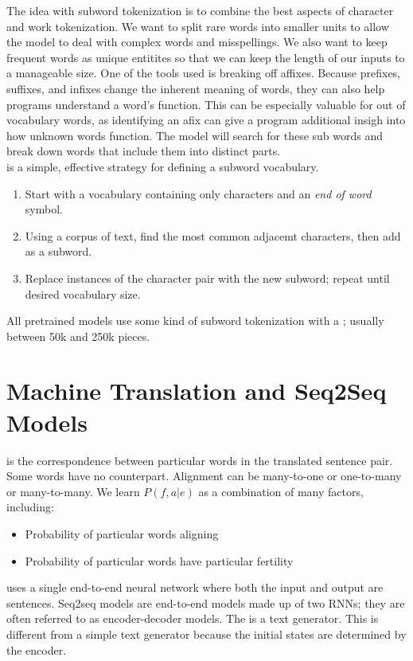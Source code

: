 \documentclass{article}
\begin{document}
 The idea with subword tokenization is to combine the best aspects of character and work tokenization. We want to split rare words into smaller units to allow the model to deal with complex words and misspellings. We also want to keep frequent words as unique entitites so that we can keep the length of our inputs to a manageable size. One of the tools used is breaking off affixes. Because prefixes, suffixes, and infixes change the inherent meaning of words, they can also help programs understand a word's function. This can be especially valuable for out of vocabulary words, as identifying an afix can give a program additional insigh into how unknown words function. The  model will search for these sub words and break down words that include them into distinct parts. \\ 

  is a simple, effective strategy for defining a subword vocabulary. 
 \begin{enumerate}
   \item Start with a vocabulary containing only characters and an \emph{end of word} symbol. 
   \item Using a corpus of text, find the most common adjacemt characters, then add as a subword. 
   \item Replace instances of the character pair with the new subword; repeat until desired vocabulary size. 
 \end{enumerate}
All pretrained models use some kind of subword tokenization with a ; usually between 50k and 250k pieces. 

\section{Machine Translation and Seq2Seq Models}

 is the correspondence between particular words in the translated sentence pair. Some words have no counterpart. Alignment can be many-to-one or one-to-many or many-to-many. We learn $P(f, a \vert e)$ as a combination of many factors, including: 
\begin{itemize}
  \item Probability of particular words aligning 
  \item Probability of particular words have particular fertility
\end{itemize}
 uses a single end-to-end neural network where both the input and output are sentences. Seq2seq models are end-to-end models made up of two RNNs; they are often referred to as encoder-decoder models. The  is a text generator. This is different from a simple text generator because the initial states are determined by the encoder. \\ 
\end{document}
